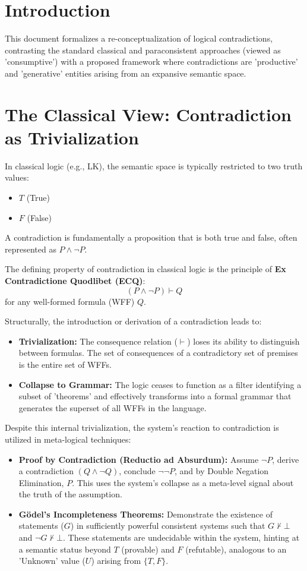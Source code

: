	
	\section{Introduction}
	
	This document formalizes a re-conceptualization of logical contradictions, contrasting the standard classical and paraconsistent approaches (viewed as 'consumptive') with a proposed framework where contradictions are 'productive' and 'generative' entities arising from an expansive semantic space.
	
	\section{The Classical View: Contradiction as Trivialization}
	
	In classical logic (e.g., LK), the semantic space is typically restricted to two truth values:
	\begin{itemize}
		\item $T$ (True)
		\item $F$ (False)
	\end{itemize}
	A contradiction is fundamentally a proposition that is both true and false, often represented as $P \land \neg P$.
	
	The defining property of contradiction in classical logic is the principle of \textbf{Ex Contradictione Quodlibet (ECQ)}:
	$$ (P \land \neg P) \vdash Q $$
	for any well-formed formula (WFF) $Q$.
	
	Structurally, the introduction or derivation of a contradiction leads to:
	\begin{itemize}
		\item \textbf{Trivialization:} The consequence relation ($\vdash$) loses its ability to distinguish between formulas. The set of consequences of a contradictory set of premises is the entire set of WFFs.
		\item \textbf{Collapse to Grammar:} The logic ceases to function as a filter identifying a subset of 'theorems' and effectively transforms into a formal grammar that generates the superset of all WFFs in the language.
	\end{itemize}
	
	Despite this internal trivialization, the system's reaction to contradiction is utilized in meta-logical techniques:
	\begin{itemize}
		\item \textbf{Proof by Contradiction (Reductio ad Absurdum):} Assume $\neg P$, derive a contradiction $(Q \land \neg Q)$, conclude $\neg \neg P$, and by Double Negation Elimination, $P$. This uses the system's collapse as a meta-level signal about the truth of the assumption.
		\item \textbf{Gödel's Incompleteness Theorems:} Demonstrate the existence of statements ($G$) in sufficiently powerful consistent systems such that $G \nvdash \bot$ and $\neg G \nvdash \bot$. These statements are undecidable within the system, hinting at a semantic status beyond $T$ (provable) and $F$ (refutable), analogous to an 'Unknown' value ($U$) arising from $\{T, F\}$.
	\end{itemize}
	
